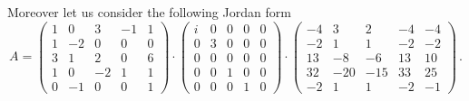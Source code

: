\documentclass[10pt,a4paper]{amsart}
\theoremstyle{plain}
\theoremstyle{remark}
\numberwithin{equation}{section} \numberwithin{defn}{section}
\begin{document}
Moreover let us consider the following Jordan form $$A = \begin{pmatrix}
1 & 0 & 3 & -1 & 1 \\
1 & -2 & 0 & 0 & 0 \\
3 & 1 & 2 & 0 & 6 \\
1 & 0 & -2 & 1 & 1 \\
0 & -1 & 0 & 0 & 1
\end{pmatrix}\cdot \begin{pmatrix}
i & 0 & 0 & 0 & 0 \\
0 & 3 & 0 & 0 & 0 \\
0 & 0 & 0 & 0 & 0 \\
0 & 0 & 1 & 0 & 0 \\
0 & 0 & 0 & 1 & 0
\end{pmatrix} \cdot \begin{pmatrix}
-4 & 3 & 2 & -4 & -4 \\
-2 & 1 & 1 & -2 & -2 \\
13 & -8 & -6 & 13 & 10 \\
32 & -20 & -15 & 33 & 25 \\
-2 & 1 & 1 & -2 & -1
\end{pmatrix}\, .$$\noindent
\end{document}
